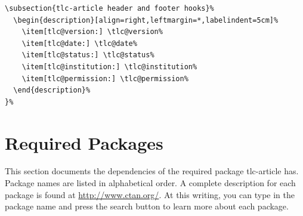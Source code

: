 \documentclass[12pt]{tlc-article}
\begin{document}
\begin{lstlisting}[basicstyle=\tiny]
  \subsection{tlc-article header and footer hooks}%
  \begin{description}[align=right,leftmargin=*,labelindent=5cm]%
    \item[tlc@version:] \tlc@version%
    \item[tlc@date:] \tlc@date%
    \item[tlc@status:] \tlc@status%
    \item[tlc@institution:] \tlc@institution%
    \item[tlc@permission:] \tlc@permission%
  \end{description}%
}%
\end{lstlisting}



\clearpage
\section{Required Packages}
This section documents the dependencies of the required package tlc-article has.
Package names are listed in alphabetical order. A complete description for each
package is found at \url{http://www.ctan.org/}. At this writing, you can type in
the package name and press the search button to learn more about each package.

\csvreader[tlcPkgStyle, separator=pipe]{\tlcPkgFile}{}{\name & \description}

\end{document}
